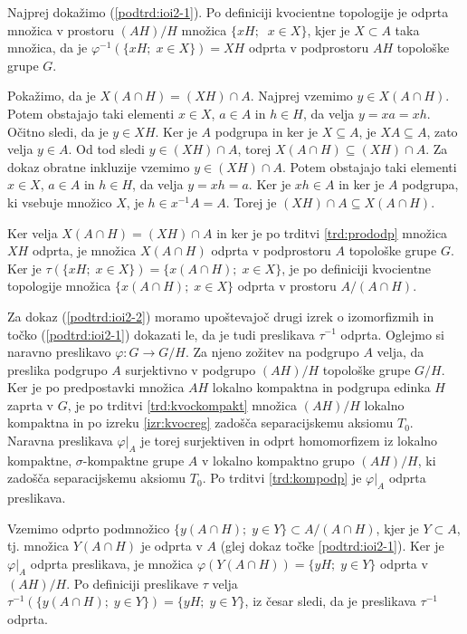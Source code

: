 \documentclass[mat1]{fmfdelo}
\begin{document}
\begin{dokaz}
Najprej dokažimo (\ref{podtrd:ioi2-1}).
Po definiciji kvocientne topologije je odprta množica v prostoru $(AH)/H$ množica $\lbrace xH ;\; \; x\in X \rbrace$, kjer je $X \subset A$ taka množica, da je $\varphi^{-1}(\lbrace xH ;\; x\in X \rbrace) = XH$ odprta v podprostoru $AH$ topološke grupe $G$.

Pokažimo, da je $X(A \cap H) = (XH)\cap A$.
Najprej vzemimo $y \in X(A \cap H)$. Potem obstajajo taki elementi $x \in X$, $a \in A$ in $h \in H$, da velja $y = xa = xh$. Očitno sledi, da je $y \in XH$. Ker je $A$ podgrupa in ker je $X \subseteq A$, je $XA \subseteq A$, zato velja $y \in A$. Od tod sledi $y \in (XH)\cap A$, torej $X(A\cap H) \subseteq (XH)\cap A$.
Za dokaz obratne inkluzije vzemimo $y \in (XH)\cap A$. Potem obstajajo taki elementi $x \in X$, $a \in A$ in $h \in H$, da velja $y = xh = a$. Ker je $xh \in A$ in ker je $A$ podgrupa, ki vsebuje množico $X$, je $h \in x^{-1}A = A$. Torej je $(XH)\cap A \subseteq X(A \cap H)$.
 
Ker velja $X(A \cap H) = (XH)\cap A$ in ker je po trditvi \ref{trd:prododp} množica $XH$ odprta, je množica $X(A \cap H)$ odprta v podprostoru $A$ topološke grupe $G$. Ker je $\tau(\lbrace xH ;\; x \in X \rbrace) = \lbrace x(A \cap H) ;\; x \in X \rbrace$, je po definiciji kvocientne topologije množica $\lbrace x(A\cap H) ;\; x \in X \rbrace$ odprta v prostoru $A/(A \cap H)$.

Za dokaz (\ref{podtrd:ioi2-2}) moramo upoštevajoč drugi izrek o izomorfizmih in točko (\ref{podtrd:ioi2-1}) dokazati le, da je tudi preslikava $\tau^{-1}$ odprta.
Oglejmo si naravno preslikavo $\varphi\colon G \to G/H$. Za njeno zožitev na podgrupo $A$ velja, da preslika podgrupo $A$ surjektivno v podgrupo $(AH)/H$ topološke grupe $G/H$. Ker je po predpostavki množica $AH$ lokalno kompaktna in podgrupa edinka $H$ zaprta v $G$, je po trditvi \ref{trd:kvockompakt} množica $(AH)/H$ lokalno kompaktna in po izreku \ref{izr:kvocreg} zadošča separacijskemu aksiomu $T_0$. Naravna preslikava $\varphi|_A$ je torej surjektiven in odprt homomorfizem iz lokalno kompaktne, $\sigma$-kompaktne grupe $A$ v lokalno kompaktno grupo $(AH)/H$, ki zadošča separacijskemu aksiomu $T_0$. Po trditvi \ref{trd:kompodp} je $\varphi|_A$ odprta preslikava.

Vzemimo odprto podmnožico $\lbrace y(A \cap H) ;\; y \in Y \rbrace \subset A/(A \cap H)$, kjer je $Y \subset A$, tj. množica $Y(A \cap H)$ je odprta v $A$ (glej dokaz točke \ref{podtrd:ioi2-1}). Ker je $\varphi|_A$ odprta preslikava, je množica $\varphi(Y(A \cap H)) = \lbrace yH ;\; y \in Y \rbrace$ odprta v $(AH)/H$. Po definiciji preslikave $\tau$ velja $\tau^{-1}(\lbrace y(A \cap H) ;\; y \in Y \rbrace) = \lbrace yH ;\; y \in Y \rbrace$, iz česar sledi, da je preslikava $\tau^{-1}$ odprta.
\end{dokaz}
\end{document}
